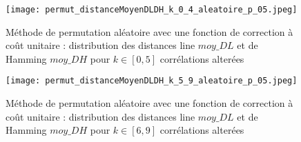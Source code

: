 \begin{figure}[htb!] 
\centering
\texttt{[image: permut\_distanceMoyenDLDH\_k\_0\_4\_aleatoire\_p\_05.jpeg]}
\caption{ M\'ethode de permutation al\'eatoire avec une fonction de correction \`a co\^ut unitaire : distribution des distances line $moy\_DL$ et de Hamming $moy\_DH$ pour $k \in [0,  5]$ corr\'elations alter\'ees}
\label{permut_distanceMoyenDLDH_k_0_5_aleatoire_p_05} 
\end{figure}

\begin{figure}[htb!] 
\centering
\texttt{[image: permut\_distanceMoyenDLDH\_k\_5\_9\_aleatoire\_p\_05.jpeg]}
\caption{ M\'ethode de permutation al\'eatoire avec une fonction de correction \`a co\^ut unitaire : distribution des distances line $moy\_DL$ et de Hamming $moy\_DH$ pour $k \in [6,  9]$ corr\'elations alter\'ees}
\label{permut_distanceMoyenDLDH_k_5_9_aleatoire_p_05} 
\end{figure}


